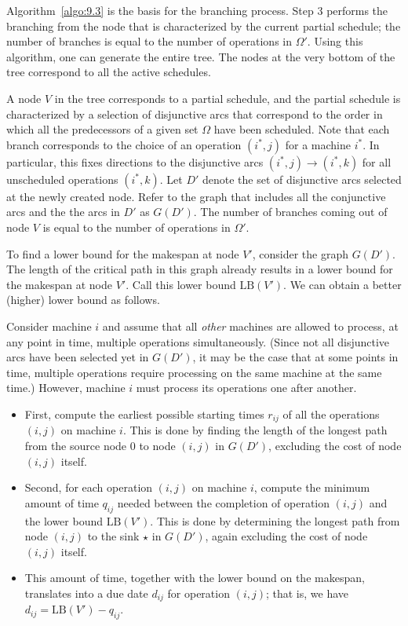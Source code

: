 Algorithm~\ref{algo:9.3} is the basis for the branching process. Step 3 
performs the branching from the node that is characterized by the 
current partial schedule; the number of branches is equal to the 
number of operations in $\Omega'$. Using this algorithm, one can 
generate the entire tree. The nodes at the very bottom of the tree 
correspond to all the active schedules. 

A node $V$ in the tree corresponds to a partial schedule, and the partial 
schedule is characterized by a selection of disjunctive arcs that 
correspond to the order in which all the predecessors of a given set 
$\Omega$ have been scheduled. 
Note that each branch corresponds to the choice of an operation $(i^*, j)$ 
for a machine $i^*$. In particular, this fixes directions to the disjunctive 
arcs $(i^*, j) \to (i^*, k)$ for all unscheduled operations $(i^*, k)$. 
Let $D'$ denote the set of disjunctive arcs selected at the newly created 
node. Refer to the graph that includes all the conjunctive arcs and the 
the arcs in $D'$ as $G(D')$. The number of branches coming out of node $V$ 
is equal to the number of operations in $\Omega'$. 

To find a lower bound for the makespan at node $V'$, consider the graph 
$G(D')$. The length of the critical path in this graph already results 
in a lower bound for the makespan at node $V'$. Call this lower bound 
$\text{LB}(V')$. We can obtain a better (higher) lower bound as follows. 

Consider machine $i$ and assume that all \emph{other} machines are allowed 
to process, at any point in time, multiple operations simultaneously. 
(Since not all disjunctive arcs have been selected yet in $G(D')$, it 
may be the case that at some points in time, multiple operations 
require processing on the same machine at the same time.) However, machine $i$ 
must process its operations one after another. 

\begin{itemize}
    \item First, compute the earliest possible starting times $r_{ij}$ 
    of all the operations $(i, j)$ on machine $i$. This is done by 
    finding the length of the longest path from the source node $0$ to 
    node $(i, j)$ in $G(D')$, excluding the cost of node $(i, j)$ itself. 

    \item Second, for each operation $(i, j)$ on machine $i$, compute the 
    minimum amount of time $q_{ij}$ needed between the completion of operation $(i, j)$ 
    and the lower bound $\text{LB}(V')$. This is done by determining the 
    longest path from node $(i, j)$ to the sink $\star$ in $G(D')$, again 
    excluding the cost of node $(i, j)$ itself. 

    \item This amount of time, together with the lower bound on the makespan, 
    translates into a due date $d_{ij}$ for operation $(i, j)$; that is, 
    we have $d_{ij} = \text{LB}(V') - q_{ij}$. 
\end{itemize}

